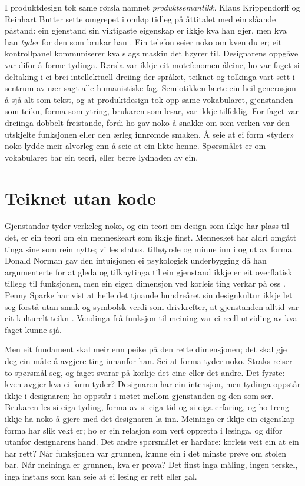 I produktdesign tok same rørsla namnet \emph{produktsemantikk}. Klaus Krippendorff og Reinhart Butter sette omgrepet i omløp tidleg på åttitalet med ein slåande påstand: ein gjenstand sin viktigaste eigenskap er ikkje kva han gjer, men kva han \emph{tyder} for den som brukar han \autocite{krippendorff1984semantics}. Ein telefon seier noko om kven du er; eit kontrollpanel kommuniserer kva slags maskin det høyrer til. Designarens oppgåve var difor å forme tydinga. Rørsla var ikkje eit motefenomen åleine, ho var faget si deltaking i ei brei intellektuell dreiing der språket, teiknet og tolkinga vart sett i sentrum av nær sagt alle humanistiske fag. Semiotikken lærte ein heil generasjon å sjå alt som tekst, og at produktdesign tok opp same vokabularet, gjenstanden som teikn, forma som ytring, brukaren som lesar, var ikkje tilfeldig. For faget var dreiinga dobbelt freistande, fordi ho gav noko å snakke om som verken var den utskjelte funksjonen eller den ærleg innrømde smaken. Å seie at ei form «tyder» noko lydde meir alvorleg enn å seie at ein likte henne. Spørsmålet er om vokabularet bar ein teori, eller berre lydnaden av ein.

\section{Teiknet utan kode}

Gjenstandar tyder verkeleg noko, og ein teori om design som ikkje har plass til det, er ein teori om ein menneskeart som ikkje finst. Mennesket har aldri omgått tinga sine som rein nytte; vi les status, tilhøyrsle og minne inn i og ut av forma. Donald Norman gav den intuisjonen ei psykologisk underbygging då han argumenterte for at gleda og tilknytinga til ein gjenstand ikkje er eit overflatisk tillegg til funksjonen, men ein eigen dimensjon ved korleis ting verkar på oss \autocite{norman2004emotional}. Penny Sparke har vist at heile det tjuande hundreåret sin designkultur ikkje let seg forstå utan smak og symbolsk verdi som drivkrefter, at gjenstanden alltid var eit kulturelt teikn \autocite{sparke1986}. Vendinga frå funksjon til meining var ei reell utviding av kva faget kunne sjå.

Men eit fundament skal meir enn peike på den rette dimensjonen; det skal gje deg ein måte å avgjere ting innanfor han. Sei at forma tyder noko. Straks reiser to spørsmål seg, og faget svarar på korkje det eine eller det andre. Det fyrste: kven avgjer kva ei form tyder? Designaren har ein intensjon, men tydinga oppstår ikkje i designaren; ho oppstår i møtet mellom gjenstanden og den som ser. Brukaren les si eiga tyding, forma av si eiga tid og si eiga erfaring, og ho treng ikkje ha noko å gjere med det designaren la inn. Meininga er ikkje ein eigenskap forma har slik vekt er; ho er ein relasjon som vert oppretta i lesinga, og difor utanfor designarens hand. Det andre spørsmålet er hardare: korleis veit ein at ein har rett? Når funksjonen var grunnen, kunne ein i det minste prøve om stolen bar. Når meininga er grunnen, kva er prøva? Det finst inga måling, ingen terskel, inga instans som kan seie at ei lesing er rett eller gal.

